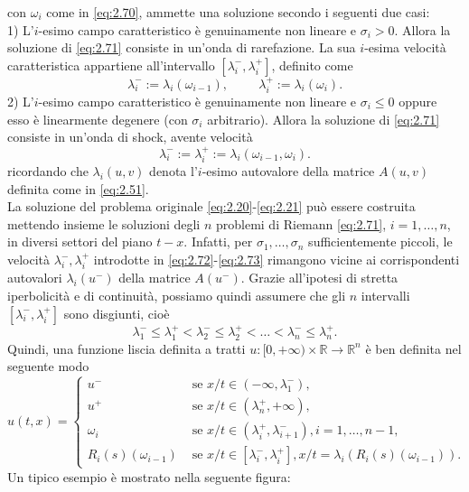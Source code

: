 con $\omega_{i}$ come in \eqref{eq:2.70}, ammette una soluzione secondo i seguenti due casi:\\
1) L'$i$-esimo campo caratteristico è genuinamente non lineare e $\sigma_{i}>0$. Allora la soluzione di \eqref{eq:2.71} consiste in un'onda di rarefazione. La sua $i$-esima velocità caratteristica appartiene all'intervallo $[\lambda_{i}^{-},\lambda_{i}^{+}]$, definito come
\begin{equation}\label{eq:2.72}
    \lambda_{i}^{-}:=\lambda_{i}(\omega_{i-1}),\hspace{1cm}\lambda_{i}^{+}:=\lambda_{i}(\omega_{i}).
\end{equation}
2) L'$i$-esimo campo caratteristico è genuinamente non lineare e $\sigma_{i}\leq 0$ oppure esso è linearmente degenere (con $\sigma_{i}$ arbitrario). Allora la soluzione di \eqref{eq:2.71} consiste in un'onda di shock, avente velocità
\begin{equation}\label{eq:2.73}
    \lambda_{i}^{-}:=\lambda_{i}^{+}:=\lambda_{i}(\omega_{i-1},\omega_{i}).
\end{equation}
ricordando che $\lambda_{i}(u,v)$ denota l'$i$-esimo autovalore della matrice $A(u,v)$ definita come in \eqref{eq:2.51}.\\
La soluzione del problema originale \eqref{eq:2.20}-\eqref{eq:2.21} può essere costruita mettendo insieme le soluzioni degli $n$ problemi di Riemann \eqref{eq:2.71}, $i=1,\ldots,n$, in diversi settori del piano $t-x$. Infatti, per $\sigma_{1},\ldots,\sigma_{n}$ sufficientemente piccoli, le velocità $\lambda_{i}^{-}, \lambda_{i}^{+}$ introdotte in \eqref{eq:2.72}-\eqref{eq:2.73} rimangono vicine ai corrispondenti autovalori $\lambda_{i}(u^{-})$ della matrice $A(u^{-})$. Grazie all'ipotesi di stretta iperbolicità e di continuità, possiamo quindi assumere che gli $n$ intervalli $[\lambda_{i}^{-},\lambda_{i}^{+}]$ sono disgiunti, cioè
\begin{equation*}
    \lambda_{1}^{-}\leq\lambda_{1}^{+}<\lambda_{2}^{-}\leq\lambda_{2}^{+}<\ldots<\lambda_{n}^{-}\leq\lambda_{n}^{+}.
\end{equation*}
Quindi, una funzione liscia definita a tratti $u\colon [0,+\infty)\times\mathbb{R}\rightarrow\mathbb{R}^{n}$ è ben definita nel seguente modo
\begin{equation}\label{eq:2.74}
    u(t,x)=
    \begin{cases}
        u^{-}&\text{ se }x/t\in (-\infty,\lambda_{1}^{-}),\\
        u^{+}&\text{ se }x/t\in (\lambda_{n}^{+},+\infty),\\
        \omega_{i}&\text{ se }x/t\in (\lambda_{i}^{+},\lambda_{i+1}^{-}), i=1,\ldots,n-1,\\
        R_{i}(s)(\omega_{i-1})&\text{ se }x/t\in [\lambda_{i}^{-},\lambda_{i}^{+}], x/t=\lambda_{i}(R_{i}(s)(\omega_{i-1})).
    \end{cases}
\end{equation}
Un tipico esempio è mostrato nella seguente figura:

